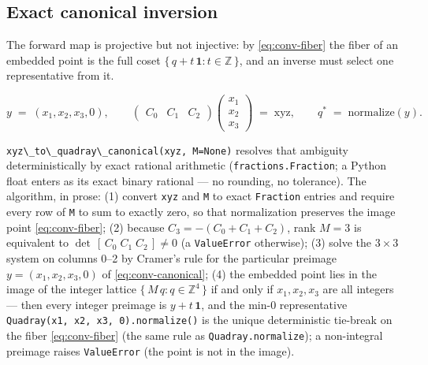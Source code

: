 \documentclass[
  10pt,
]{article}
\newcommand{\passthrough}[1]{#1}
\begin{document}
\subsection{Exact canonical inversion}\label{exact-canonical-inversion}

The forward map is projective but not injective: by
\eqref{eq:conv-fiber} the fiber of an embedded point is the full coset
\(\{\,q + t\,\mathbf{1} : t \in \mathbb{Z}\,\}\), and an inverse must
select one representative from it.

\begin{equation}
\label{eq:conv-canonical}
y \;=\; (x_1, x_2, x_3, 0), \qquad
\begin{pmatrix} C_0 & C_1 & C_2 \end{pmatrix}
\begin{pmatrix} x_1 \\ x_2 \\ x_3 \end{pmatrix} \;=\; \mathrm{xyz},
\qquad q^\ast \;=\; \mathrm{normalize}(y).
\end{equation}

\passthrough{\lstinline!xyz\_to\_quadray\_canonical(xyz, M=None)!}
resolves that ambiguity deterministically by exact rational arithmetic
(\passthrough{\lstinline!fractions.Fraction!}; a Python float enters as
its exact binary rational --- no rounding, no tolerance). The algorithm,
in prose: (1) convert \passthrough{\lstinline!xyz!} and
\passthrough{\lstinline!M!} to exact \passthrough{\lstinline!Fraction!}
entries and require every row of \passthrough{\lstinline!M!} to sum to
exactly zero, so that normalization preserves the image point
\eqref{eq:conv-fiber}; (2) because \(C_3 = -(C_0 + C_1 + C_2)\), rank
\(M = 3\) is equivalent to \(\det\,[\,C_0\; C_1\; C_2\,] \neq 0\) (a
\passthrough{\lstinline!ValueError!} otherwise); (3) solve the
\(3 \times 3\) system on columns 0--2 by Cramer's rule for the
particular preimage \(y = (x_1, x_2, x_3, 0)\) of
\eqref{eq:conv-canonical}; (4) the embedded point lies in the image of
the integer lattice \(\{\,M\,q : q \in \mathbb{Z}^{4}\,\}\) if and only
if \(x_1, x_2, x_3\) are all integers --- then every integer preimage is
\(y + t\,\mathbf{1}\), and the min-0 representative
\passthrough{\lstinline!Quadray(x1, x2, x3, 0).normalize()!} is the
unique deterministic tie-break on the fiber \eqref{eq:conv-fiber} (the
same rule as \passthrough{\lstinline!Quadray.normalize!}); a
non-integral preimage raises \passthrough{\lstinline!ValueError!} (the
point is not in the image).
\end{document}
